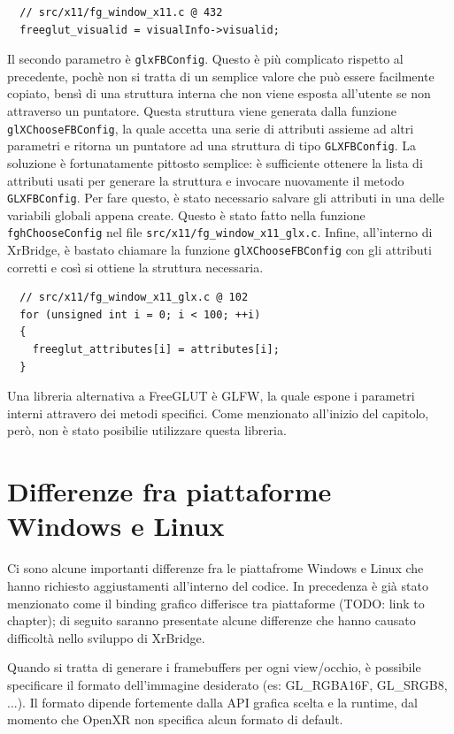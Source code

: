 \documentclass[twoside]{supsistudent}
\begin{document}
\begin{verbatim}
  // src/x11/fg_window_x11.c @ 432
  freeglut_visualid = visualInfo->visualid;
\end{verbatim}

Il secondo parametro è \texttt{glxFBConfig}. Questo è più complicato rispetto al precedente, pochè non si tratta di un semplice valore che può essere facilmente copiato, bensì di una struttura interna che non viene esposta all'utente se non attraverso un puntatore. Questa struttura viene generata dalla funzione \texttt{glXChooseFBConfig}, la quale accetta una serie di attributi assieme ad altri parametri e ritorna un puntatore ad una struttura di tipo \texttt{GLXFBConfig}. La soluzione è fortunatamente pittosto semplice: è sufficiente ottenere la lista di attributi usati per generare la struttura e invocare nuovamente il metodo \texttt{GLXFBConfig}. Per fare questo, è stato necessario salvare gli attributi in una delle variabili globali appena create. Questo è stato fatto nella funzione \texttt{fghChooseConfig} nel file \texttt{src/x11/fg\_window\_x11\_glx.c}. Infine, all'interno di XrBridge, è bastato chiamare la funzione \texttt{glXChooseFBConfig} con gli attributi corretti e così si ottiene la struttura necessaria.

\begin{verbatim}
  // src/x11/fg_window_x11_glx.c @ 102
  for (unsigned int i = 0; i < 100; ++i)
  {
    freeglut_attributes[i] = attributes[i];
  }
\end{verbatim}

Una libreria alternativa a FreeGLUT è GLFW, la quale espone i parametri interni attravero dei metodi specifici. Come menzionato all'inizio del capitolo, però, non è stato posibilie utilizzare questa libreria.

\section{Differenze fra piattaforme Windows e Linux}

Ci sono alcune importanti differenze fra le piattafrome Windows e Linux che hanno richiesto aggiustamenti all'interno del codice. In precedenza è già stato menzionato come il binding grafico differisce tra piattaforme (TODO: link to chapter); di seguito saranno presentate alcune differenze che hanno causato difficoltà nello sviluppo di XrBridge.

Quando si tratta di generare i framebuffers per ogni view/occhio, è possibile specificare il formato dell'immagine desiderato (es: GL\_RGBA16F, GL\_SRGB8, ...). Il formato dipende fortemente dalla API grafica scelta e la runtime, dal momento che OpenXR non specifica alcun formato di default.
\end{document}
